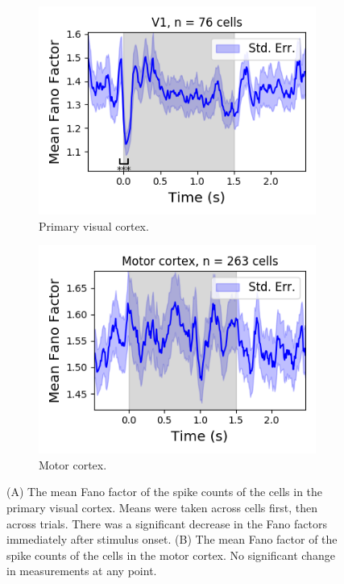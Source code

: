   \begin{figure}[h]
    \begin{subfigure}[h]{0.5\linewidth}
      \includegraphics[width=\linewidth]{figures/conway_maxwell/v1_1ms_fano_factor.png}
      \caption{Primary visual cortex.}
      \label{fig:v1_1ms_fano_factor}
    \end{subfigure}
    \begin{subfigure}[h]{0.5\linewidth}
      \includegraphics[width=\linewidth]{figures/conway_maxwell/motor_cortex_1ms_fano_factor.png}
      \caption{Motor cortex.}
      \label{fig:motor_cortex_fano_factor}
    \end{subfigure}
    \caption{(A) The mean Fano factor of the spike counts of the cells in the primary visual cortex. Means were taken across cells first, then across trials. There was a significant decrease in the Fano factors immediately after stimulus onset. (B) The mean Fano factor of the spike counts of the cells in the motor cortex. No significant change in measurements at any point.}
    \label{fig:fano_factors}
  \end{figure}

